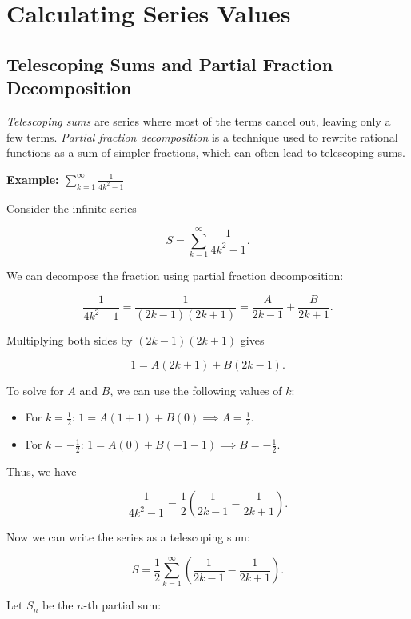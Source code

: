\chapter{Calculating Series Values}

\section{Telescoping Sums and Partial Fraction Decomposition}

\emph{Telescoping sums} are series where most of the terms cancel out, leaving only a few terms. \emph{Partial fraction decomposition} is a 
technique used to rewrite rational functions as a sum of simpler fractions, which can often lead to telescoping sums.

\textbf{Example: \(\sum_{k=1}^{\infty} \frac{1}{4k^2 - 1}\)}

Consider the infinite series

\[
    S = \sum_{k=1}^{\infty} \frac{1}{4k^2 - 1}.
\]

We can decompose the fraction using partial fraction decomposition:

\[
    \frac{1}{4k^2 - 1} = \frac{1}{(2k - 1)(2k + 1)} = \frac{A}{2k - 1} + \frac{B}{2k + 1}.
\]

Multiplying both sides by \((2k - 1)(2k + 1)\) gives

\[
    1 = A(2k + 1) + B(2k - 1).
\]

To solve for \(A\) and \(B\), we can use the following values of \(k\):

\begin{itemize}

    \item For \(k = \frac{1}{2}\): \(1 = A(1 + 1) + B(0) \implies A = \frac{1}{2}\).

    \item For \(k = -\frac{1}{2}\): \(1 = A(0) + B(-1 - 1) \implies B = -\frac{1}{2}\).

\end{itemize}

Thus, we have

\[
    \frac{1}{4k^2 - 1} = \frac{1}{2} \left( \frac{1}{2k - 1} - \frac{1}{2k + 1} \right).
\]

Now we can write the series as a telescoping sum:

\[
    S = \frac{1}{2} \sum_{k=1}^{\infty} \left( \frac{1}{2k - 1} - \frac{1}{2k + 1} \right).
\]

Let \(S_n\) be the \(n\)-th partial sum:


